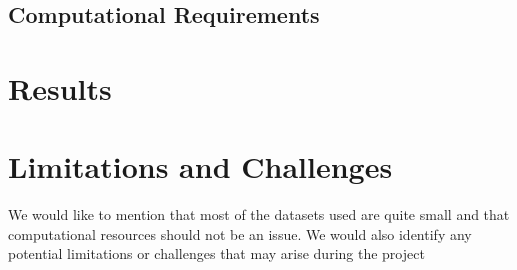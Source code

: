 \documentclass{article}
\begin{document}
    \subsection{Computational Requirements}\label{subsec:computational-requirements}
    

    \section{Results}\label{sec:results}
    

    \section{Limitations and Challenges}\label{sec:limitations-and-challenges}
    We would like to mention that most of the datasets used are quite small and that computational resources should
    not be an issue.
    We would also identify any potential limitations or challenges that may arise during the project

    
\end{document}
